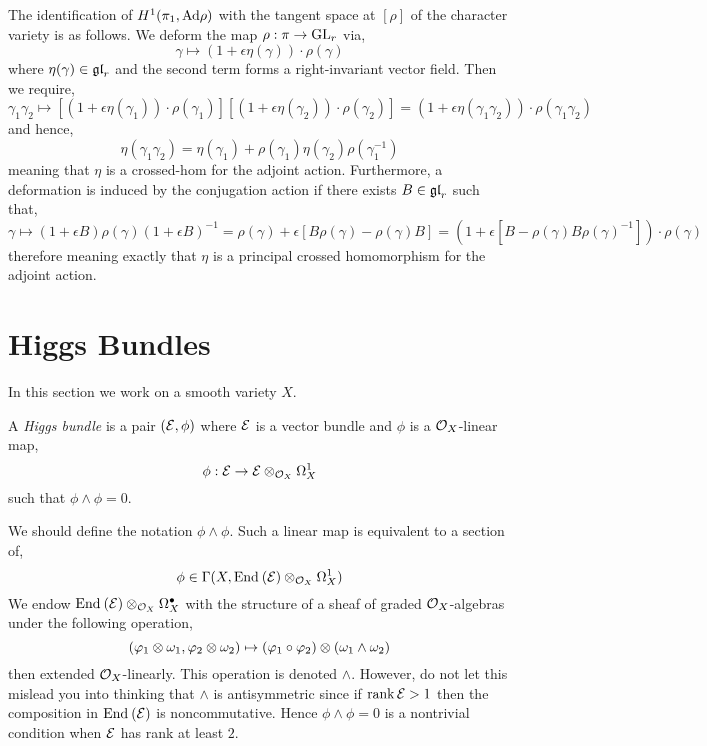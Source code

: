 \documentclass[12pt]{article}
\begin{document}
\begin{rmk}
The identification of $H^1(\pi_1, \mathrm{Ad}{\rho})$ with the tangent space at $[\rho]$ of the character variety is as follows. We deform the map $\rho : \pi \to \mathrm{GL}_r$ via,
\[ \gamma \mapsto (1 + \epsilon \eta(\gamma)) \cdot \rho(\gamma) \]
where $\eta(\gamma) \in \mathfrak{gl}_r$ and the second term forms a right-invariant vector field. Then we require,
\[ \gamma_1 \gamma_2 \mapsto [(1 + \epsilon \eta(\gamma_1)) \cdot \rho(\gamma_1)][(1 + \epsilon \eta(\gamma_2)) \cdot \rho(\gamma_2)] = (1 + \epsilon \eta(\gamma_1 \gamma_2)) \cdot \rho(\gamma_1 \gamma_2) \]
and hence,
\[ \eta(\gamma_1 \gamma_2) = \eta(\gamma_1) + \rho(\gamma_1) \eta(\gamma_2) \rho(\gamma_1^{-1}) \]
meaning that $\eta$ is a crossed-hom for the adjoint action. Furthermore, a deformation is induced by the conjugation action if there exists $B \in \mathfrak{gl}_r$ such that,
\[ \gamma \mapsto (1 + \epsilon B) \rho(\gamma) (1 + \epsilon B)^{-1} = \rho(\gamma) + \epsilon [B \rho(\gamma) - \rho(\gamma) B] = (1 + \epsilon [B - \rho(\gamma) B \rho(\gamma)^{-1}]) \cdot \rho(\gamma) \]
therefore meaning exactly that $\eta$ is a principal crossed homomorphism for the adjoint action.
\end{rmk}

\section{Higgs Bundles}

In this section we work on a smooth variety $X$.

\begin{defn}
A \textit{Higgs bundle} is a pair $(\mathcal{E}, \phi)$ where $\mathcal{E}$ is a vector bundle and $\phi$ is a $\mathcal{O}_{X}$-linear map,
\[ \phi : \mathcal{E} \to \mathcal{E} \otimes_{\mathcal{O}_{X}} \Omega_X^1 \]
such that $\phi \wedge \phi = 0$.
\end{defn}

\begin{rmk}
We should define the notation $\phi \wedge \phi$. Such a linear map is equivalent to a section of,
\[ \phi \in \Gamma(X, \mathrm{End}_{} \left( \mathcal{E} \right) \otimes_{\mathcal{O}_{X}} \Omega^1_X) \]
We endow $\mathrm{End}_{} \left( \mathcal{E} \right) \otimes_{\mathcal{O}_{X}} \Omega^\bullet_X$ with the structure of a sheaf of graded $\mathcal{O}_{X}$-algebras under the following operation,
\[ (\varphi_1 \otimes \omega_1, \varphi_2 \otimes \omega_2) \mapsto (\varphi_1 \circ \varphi_2) \otimes (\omega_1 \wedge \omega_2) \]
then extended $\mathcal{O}_{X}$-linearly. This operation is denoted $\wedge$. However, do not let this mislead you into thinking that $\wedge$ is antisymmetric since if $\operatorname{\mathrm{rank}}{\mathcal{E}} > 1$ then the composition in $\mathrm{End}_{} \left( \mathcal{E} \right)$ is noncommutative. Hence $\phi \wedge \phi = 0$ is a nontrivial condition when $\mathcal{E}$ has rank at least $2$.
\end{rmk}
\end{document}
